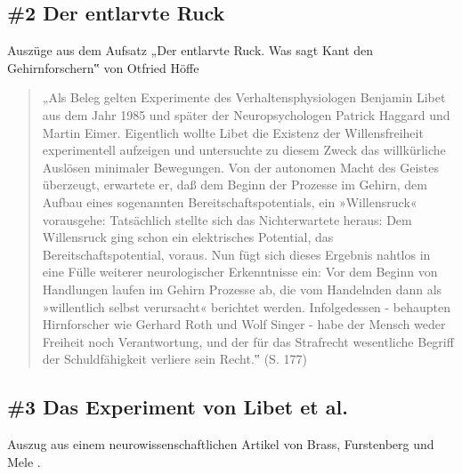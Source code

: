 \documentclass[
  a4paper,
]{report}
\begin{document}
\hypertarget{def-expert-ev2}{%
\subsection{\#2 Der entlarvte Ruck}\label{def-expert-ev2}}

Auszüge aus dem Aufsatz „Der entlarvte Ruck. Was sagt Kant den Gehirnforschern‟ von Otfried Höffe \citeyearpar{Höffe2004}

\begin{quote}
„Als Beleg gelten Experimente des Verhaltensphysiologen Benjamin Libet aus dem Jahr 1985 und später der Neuropsychologen Patrick Haggard und Martin Eimer. Eigentlich wollte Libet die Existenz der Willensfreiheit experimentell aufzeigen und untersuchte zu diesem Zweck das willkürliche Auslösen minimaler Bewegungen. Von der autonomen Macht des Geistes überzeugt, erwartete er, daß dem Beginn der Prozesse im Gehirn, dem Aufbau eines sogenannten Bereitschaftspotentials, ein »Willensruck« vorausgehe: Tatsächlich stellte sich das Nichterwartete heraus: Dem Willensruck ging schon ein elektrisches Potential, das Bereitschaftspotential, voraus. Nun fügt sich dieses Ergebnis nahtlos in eine Fülle weiterer neurologischer Erkenntnisse ein: Vor dem Beginn von Handlungen laufen im Gehirn Prozesse ab, die vom Handelnden dann als »willentlich selbst verursacht« berichtet werden. Infolgedessen - behaupten Hirnforscher wie Gerhard Roth und Wolf Singer - habe der Mensch weder Freiheit noch Verantwortung, und der für das Strafrecht wesentliche Begriff der Schuldfähigkeit verliere sein Recht.‟ (S. 177)
\end{quote}

\hypertarget{def-expert-ev3}{%
\subsection{\#3 Das Experiment von Libet et al.~}\label{def-expert-ev3}}

Auszug aus einem neurowissenschaftlichen Artikel von Brass, Furstenberg und Mele \citeyearpar{Brass2019}.
\end{document}
